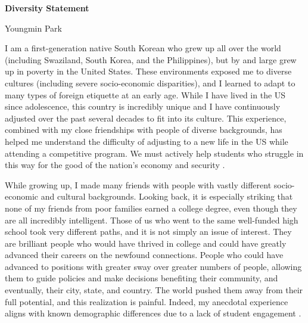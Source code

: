 \documentclass[a4paper,11pt]{article}
\begin{document}
\begin{center}
\Large \textbf{Diversity Statement}

\Large Youngmin Park
\end{center}

I am a first-generation native South Korean who grew up all over the world (including Swaziland, South Korea, and the Philippines), but by and large grew up in poverty in the United States. These environments exposed me to diverse cultures (including severe socio-economic disparities), and I learned to adapt to many types of foreign etiquette at an early age. While I have lived in the US since adolescence, this country is incredibly unique and I have continuously adjusted over the past several decades to fit into its culture. This experience, combined with my close friendships with people of diverse backgrounds, has helped me understand the difficulty of adjusting to a new life in the US while attending a competitive program. We must actively help students who struggle in this way for the good of the nation's economy and security \cite{jones2018call}.

While growing up, I made many friends with people with vastly different socio-economic and cultural backgrounds. Looking back, it is especially striking that none of my friends from poor families earned a college degree, even though they are all incredibly intelligent. Those of us who went to the same well-funded high school took very different paths, and it is not simply an issue of interest. They are brilliant people who would have thrived in college and could have greatly advanced their careers on the newfound connections. People who could have advanced to positions with greater sway over greater numbers of people, allowing them to guide policies and make decisions benefiting their community, and eventually, their city, state, and country. The world pushed them away from their full potential, and this realization is painful. Indeed, my anecdotal experience aligns with known demographic differences \cite{jones2018call} due to a lack of student engagement \cite{kokkelenberg2010succeeds,savaria2017critical}.
\end{document}

